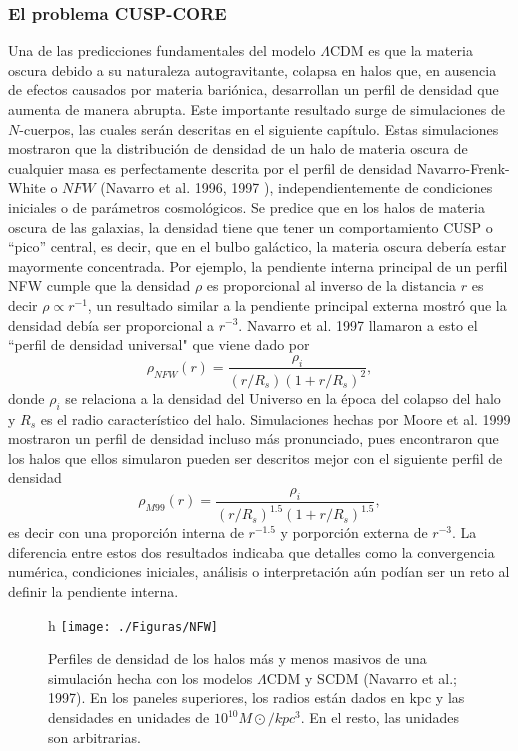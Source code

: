 \documentclass[a4paper,openright,10pt, oneside, final]{book}
\begin{document}
\subsubsection*{El problema CUSP-CORE} 
Una de las predicciones fundamentales del modelo $\Lambda$CDM es que la materia oscura debido a su naturaleza autogravitante, colapsa en halos que, en ausencia de efectos causados por materia bariónica, desarrollan un perfil de densidad que aumenta de manera abrupta. Este importante resultado surge de simulaciones de $N$-cuerpos, las cuales serán descritas en el siguiente capítulo. Estas simulaciones mostraron que la distribución de densidad de un halo de materia oscura de cualquier masa es perfectamente descrita por el perfil de densidad Navarro-Frenk-White o $NFW$ (Navarro et al. 1996, 1997 \cite{b1}), independientemente de condiciones iniciales o de parámetros cosmológicos. Se predice que en los halos de materia oscura de las galaxias, la densidad tiene que tener un comportamiento CUSP o ``pico'' central, es decir, que en el bulbo galáctico, la materia oscura debería estar mayormente concentrada. Por ejemplo, la pendiente interna principal de un perfil NFW cumple que la densidad $\rho$ es proporcional al inverso de la distancia $r$ es decir $\rho \propto r^{-1}$, un resultado similar a la pendiente principal externa mostró que la densidad debía ser proporcional a $r^{-3}$. Navarro et al. 1997 \cite{b1} llamaron a esto el ``perfil de densidad universal"  que viene dado por
\begin{equation}
\rho_{NFW}(r)= \frac{\rho_{i}}{(r/R_{s})(1 + r/R_{s})^{2}},\label{eqn 1.44}
\end{equation}
donde $\rho_{i}$ se relaciona a la densidad del Universo en la época del colapso del halo y $R_{s}$ es el radio característico del halo. Simulaciones hechas por Moore et al. 1999 \cite{Moore 1999} mostraron un perfil de densidad incluso más pronunciado, pues encontraron que los halos que ellos simularon pueden ser descritos mejor con el siguiente perfil de densidad
\begin{equation}
\rho_{M99}(r)= \frac{\rho_{i}}{(r/R_{s})^{1.5}(1 + r/R_{s})^{1.5}},\label{eqn 1.45}
\end{equation} 
es decir con una proporción interna de $r^{-1.5}$ y porporción externa de $r^{-3}$. La diferencia entre estos dos resultados indicaba que detalles como la convergencia numérica, condiciones iniciales, análisis o interpretación aún podían ser un reto al definir la pendiente interna.
\begin{figure}{h}
\centering
  \texttt{[image: ./Figuras/NFW]}
  \caption{\footnotesize{Perfiles de densidad de los halos más y menos masivos de una simulación hecha con los modelos $\Lambda$CDM y SCDM (Navarro et al.; 1997). En los paneles superiores, los radios están dados en kpc y las densidades en unidades de $10^{10} M\odot / kpc^{3}$. En el resto, las unidades son arbitrarias.}}
  \label{fig 1.9}
\end{figure}
\end{document}
